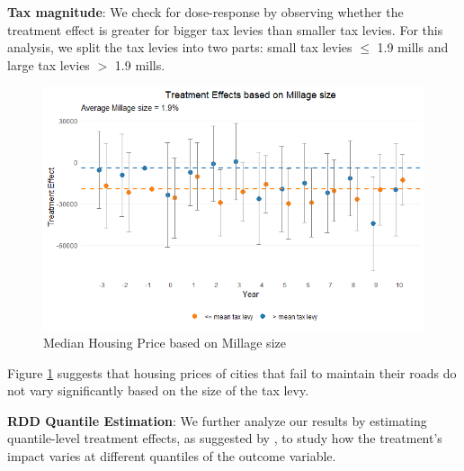 \vskip 1cm

\textbf{Tax magnitude}: We check for dose-response by observing whether the treatment effect is greater for bigger tax levies than smaller tax levies. For this analysis, we split the tax levies into two parts: small tax levies $\le$ 1.9 mills and large tax levies $>$ 1.9 mills. 

\begin{figure}[htbp]
    \centering
    \includegraphics[width=\textwidth,keepaspectratio]{images/tes_size_re.png}    
    \caption{Median Housing Price based on Millage size}
    \label{fig:tes_covs_size}
\end{figure}

Figure \ref{fig:tes_covs_size} suggests that housing prices of cities that fail to maintain their roads do not vary significantly based on the size of the tax levy.

\vskip 1cm

\textbf{RDD Quantile Estimation}: We further analyze our results by estimating quantile-level treatment effects, as suggested by \cite{FRANDSEN2012}, to study how the treatment’s impact varies at different quantiles of the outcome variable. 

